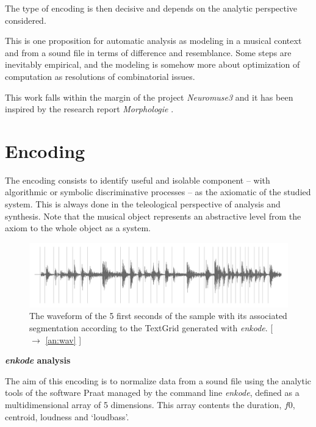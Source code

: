 The type of encoding is then decisive and depends on the analytic perspective considered.

\bigskip

This is one proposition for automatic analysis as modeling in a musical context and from a sound file in terms of difference and resemblance. Some steps are inevitably empirical, and the modeling is somehow more about optimization of computation as resolutions of combinatorial issues.

This work falls within the margin of the project \textsl{Neuromuse3} and it has been inspired by the research report \textit{Morphologie} \citep{mp}.

\section{Encoding}

The encoding consists to identify useful and isolable component -- with algorithmic or symbolic discriminative processes -- as the axiomatic of the studied system. This is always done in the teleological perspective of analysis and synthesis. 
Note that the musical object represents an abstractive level from the axiom to the whole object as a system.

\begin{figure}[!hbt]
	\begin{center}
		\includegraphics[width=\columnwidth]{img/3790}
		\caption{The waveform of the 5 first seconds of the sample with its associated segmentation according to the TextGrid generated 
		with
		 \textsl{enkode}. [ $\rightarrow$ \ref{an:wav} ]}
		\label{fig:wave}
	\end{center}
\end{figure}
	
\textbf{\textsl{enkode} analysis}
\smallskip

The aim of this encoding is to normalize data from a sound file using the analytic tools of the software Praat managed by the command line \textsl{enkode}, defined as a multidimensional array of 5 dimensions. This array contents the duration, $f0$, centroid, loudness and `loudbass'.

